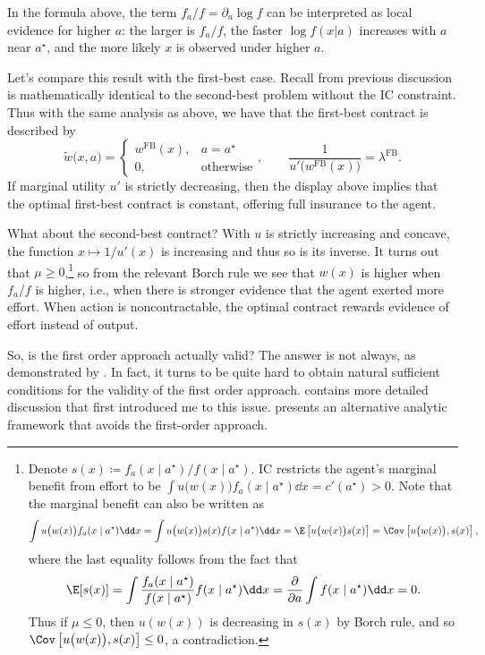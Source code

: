 In the formula above, the term \(f_a / f = \partial_a \log f\) can be interpreted as local evidence for higher \(a\): the larger is \(f_a / f\), the faster \(\log f(x | a)\) increases with \(a\) near \(a^\star\), and the more likely \(x\) is observed under higher \(a\).

Let's compare this result with the first-best case.
Recall from previous discussion is mathematically identical to the second-best problem without the IC constraint.
Thus with the same analysis as above, we have that the first-best contract is described by
\[
  \tilde{w}\big(x, a\big)
  = \begin{cases}
    w^{\mathrm{FB}}(x), & a = a^\star \\
    0, & \text{otherwise}
  \end{cases},\qquad
  \frac{1}{u'\big(w^{\mathrm{FB}}(x)\big)}
  = \lambda^{\mathrm{FB}}.
\]
If marginal utility \(u'\) is strictly decreasing, then the display above implies that the optimal first-best contract is constant, offering full insurance to the agent.

What about the second-best contract?
With \(u\) is strictly increasing and concave, the function \(x \mapsto 1 / u'(x)\) is increasing and thus so is its inverse.
It turns out that \(\mu \geq 0\),\footnote{
  Denote \(s(x) \coloneq f_a(x \mid a^\star) / f(x \mid a^\star)\).
  IC restricts the agent's marginal benefit from effort to be
  \(
    \int u\big(w(x)\big) f_a(x \mid a^\star) \dd x = c'(a^\star) > 0
  \).
  Note that the marginal benefit can also be written as
  \[
    \int u\big(w(x)\big) f_a(x \mid a^\star) \dd x
    = \int u\big(w(x)\big) s(x) f(x \mid a^\star) \dd x
    = \E\left[u\big(w(x)\big) s(x)\right]
    = \Cov\left[ u\big(w(x)\big), s(x) \right],
  \]
  where the last equality follows from the fact that  
  \[
    \E[s(x)]
    = \int \frac{f_a(x \mid a^\star)}{f(x \mid a^\star)} f(x \mid a^\star) \dd x
    = \frac{\partial}{\partial a} \int f(x \mid a^\star) \dd x
    = 0.
  \]
  Thus if \(\mu \leq 0\), then \(u(w(x))\) is decreasing in \(s(x)\) by Borch rule, and so \(\Cov\left[ u\big(w(x)\big), s(x) \right] \leq 0\), a contradiction.
} so from the relevant Borch rule we see that \(w(x)\) is higher when \(f_a / f\) is higher, i.e., when there is stronger evidence that the agent exerted more effort.
When action is noncontractable, the optimal contract rewards evidence of effort instead of output.

So, is the first order approach actually valid?
The answer is not always, as demonstrated by \textcite{mirrlees1999TheoryMoral}.
In fact, it turns to be quite hard to obtain natural sufficient conditions for the validity of the first order approach.
\textcite{barron2019ContractTheory} contains more detailed discussion that first introduced me to this issue.
\Textcite{grossman1983AnalysisPrincipalAgent} presents an alternative analytic framework that avoids the first-order approach.

